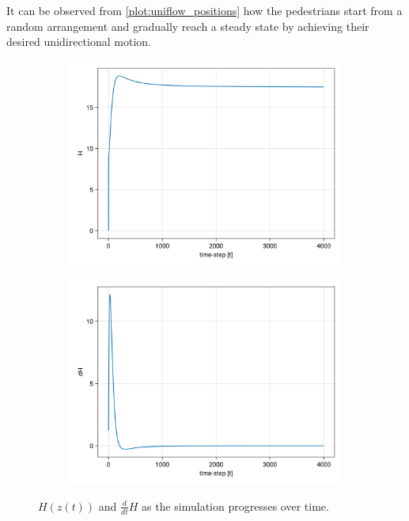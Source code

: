 It can be observed from \autoref{plot:uniflow_positions} how the pedestrians start from a random arrangement and gradually reach a steady state by achieving their desired unidirectional motion.
\begin{figure}[H]
    \centering
    \begin{subfigure}{.49\textwidth}
        \centering
        \includegraphics[width=\linewidth]{figures/ch4_uniflow/H_Uniflow.png}
    \end{subfigure}
    \begin{subfigure}{.49\textwidth}
        \centering
        \includegraphics[width=\linewidth]{figures/ch4_uniflow/dH_uni_4000dt.png}
    \end{subfigure}
    \caption{$H(z(t))$ and $\frac{d}{dt}H$ as the simulation progresses over time.}
    \label{plot:uniflow_hamiltonian}
\end{figure}

